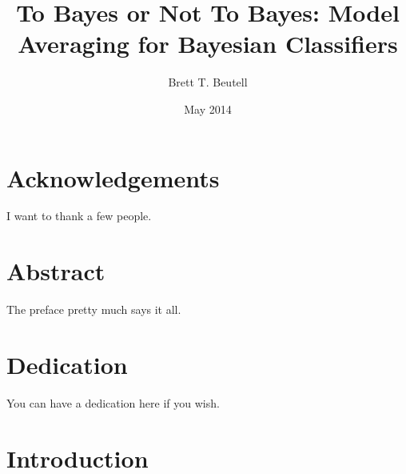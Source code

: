 \documentclass[12pt,twoside]{reedthesis}
\title{To Bayes or Not To Bayes: Model Averaging for Bayesian Classifiers}
\author{Brett T. Beutell}
\date{May 2014}
\begin{document}
  \maketitle
  \frontmatter %
  \pagestyle{empty} %

    \chapter*{Acknowledgements}
	I want to thank a few people.


    \tableofcontents

    \chapter*{Abstract}
	The preface pretty much says it all.
	
	\chapter*{Dedication}
	You can have a dedication here if you wish.

  \mainmatter %
  \pagestyle{fancyplain} %


    \chapter*{Introduction}
\end{document}

